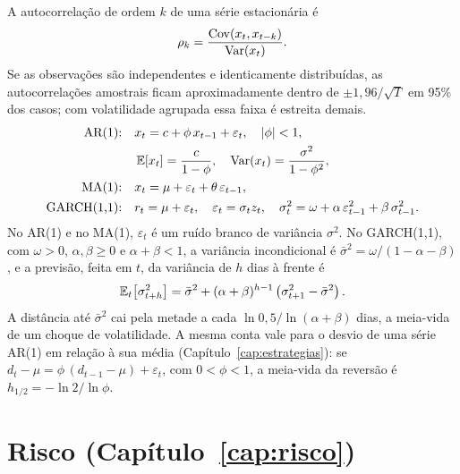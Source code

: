 A autocorrelação de ordem $k$ de uma série estacionária é
\begin{equation*}
\rho_k = \frac{\operatorname{Cov}(x_t, x_{t-k})}{\operatorname{Var}(x_t)} .
\end{equation*}
Se as observações são independentes e identicamente distribuídas, as autocorrelações amostrais ficam aproximadamente dentro de $\pm 1,96/\sqrt{T}$ em 95\% dos casos; com volatilidade agrupada essa faixa é estreita demais.
\begin{align*}
\text{AR(1):}\quad & x_t = c + \phi\,x_{t-1} + \varepsilon_t , \quad |\phi|<1 , \\
 & \operatorname{\mathbb{E}}[x_t] = \frac{c}{1-\phi} , \quad \operatorname{Var}(x_t) = \frac{\sigma^2}{1-\phi^2} , \\
\text{MA(1):}\quad & x_t = \mu + \varepsilon_t + \theta\,\varepsilon_{t-1} , \\
\text{GARCH(1,1):}\quad & r_t = \mu + \varepsilon_t , \quad \varepsilon_t = \sigma_t z_t , \quad \sigma_t^2 = \omega + \alpha\,\varepsilon_{t-1}^2 + \beta\,\sigma_{t-1}^2 .
\end{align*}
No AR(1) e no MA(1), $\varepsilon_t$ é um ruído branco de variância $\sigma^2$. No GARCH(1,1), com $\omega > 0$, $\alpha, \beta \ge 0$ e $\alpha + \beta < 1$, a variância incondicional é $\bar\sigma^2 = \omega/(1-\alpha-\beta)$, e a previsão, feita em $t$, da variância de $h$ dias à frente é
\begin{equation*}
\operatorname{\mathbb{E}}_t\!\left[\sigma_{t+h}^2\right] = \bar\sigma^2 + (\alpha+\beta)^{h-1}\left(\sigma_{t+1}^2 - \bar\sigma^2\right) .
\end{equation*}
A distância até $\bar\sigma^2$ cai pela metade a cada $\ln 0,5 / \ln(\alpha+\beta)$ dias, a meia-vida de um choque de volatilidade. A mesma conta vale para o desvio de uma série AR(1) em relação à sua média (Capítulo~\ref{cap:estrategias}): se $d_t - \mu = \phi\,(d_{t-1} - \mu) + \varepsilon_t$, com $0 < \phi < 1$, a meia-vida da reversão é $h_{1/2} = -\ln 2/\ln\phi$.

\section{Risco (Capítulo~\ref{cap:risco})}

